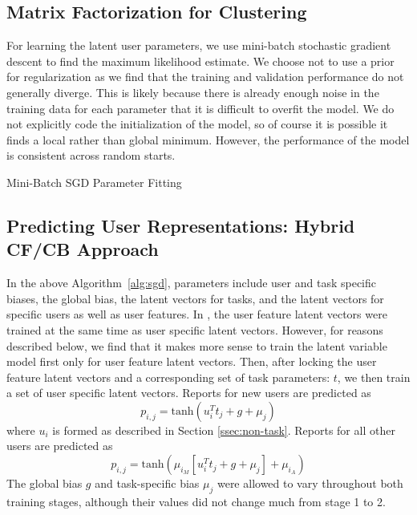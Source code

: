 \documentclass{article}
\begin{document}
\subsection{Matrix Factorization for Clustering}
For learning the latent user parameters, we use mini-batch stochastic gradient descent to find the maximum likelihood estimate. We choose not to use a prior for regularization as we find that the training and validation performance do not generally diverge. This is likely because there is already enough noise in the training data for each parameter that it is difficult to overfit the model. We do not explicitly code the initialization of the model, so of course it is possible it finds a local rather than global minimum. However, the performance of the model is consistent across random starts.

\begin{algorithm}
  \begin{algorithmic}
    \ENDFOR
    \ENDFOR
  \end{algorithmic}
  \caption{Mini-Batch SGD Parameter Fitting}
  \label{alg:sgd}
\end{algorithm}

\subsection{Predicting User Representations: Hybrid CF/CB Approach}
In the above Algorithm~\ref{alg:sgd}, parameters include user and task specific biases, the global bias, the latent vectors for tasks, and the latent vectors for specific users as well as user features. In \citep{kula2015metadata}, the user feature latent vectors were trained at the same time as user specific latent vectors. However, for reasons described below, we find that it makes more sense to train the latent variable model first only for user feature latent vectors. Then, after locking the user feature latent vectors and a corresponding set of task parameters: $t$, we then train a set of user specific latent vectors. Reports for new users are predicted as $$
  p_{i,j} = \textrm{tanh}\left(u_i^{T}t_{j} + g + \mu_{j} \right)
 $$ where $u_{i}$ is formed as described in Section \ref{ssec:non-task}. Reports for all other users are predicted as $$p_{i,j} = \textrm{tanh}\left( \mu_{i_M}\left[u_{i}^{T}t_{j} + g + \mu_j\right] + \mu_{i_A}\right)$$ The global bias $g$ and task-specific bias $\mu_{j}$ were allowed to vary throughout both training stages, although their values did not change much from stage 1 to 2. 
\end{document}
